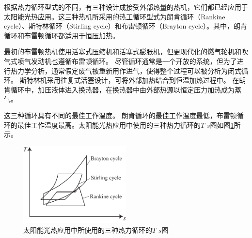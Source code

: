 根据热力循环型式的不同，有三种设计成接受外部热量的热机，它们都已经应用于太阳能光热应用。这三种热机所采用的热工循环型式为朗肯循环（Rankine cycle）、斯特林循环（Stirling cycle）和布雷顿循环（Brayton cycle）。其中，朗肯循环和布雷顿循环都适用于恒压加热。

最初的布雷顿热机使用活塞式压缩机和活塞式膨胀机，但更现代化的燃气轮机和吹气式喷气发动机也遵循布雷顿循环。 尽管循环通常是一个开放的系统，但为了进行热力学分析，通常假定废气被重新用作进气，使得整个过程可以被分析为闭式循环。
斯特林机采用往复式活塞设计，可将外部加热结合到恒温加热过程中。
在朗肯循环中，加压液体进入换热器，在换热器中由外部热源以恒定压力加热成为蒸气。

这三种循环具有不同的最佳工作温度。 朗肯循环的最佳工作温度最低，布雷顿循环的最佳工作温度最高。太阳能光热应用中使用的三种热力循环的$T$-$s$图如图\ref{fig:cycles}所示。

\begin{figure}[h]
\centering 
\includegraphics[width=0.5\textwidth]{fig/cycles}
\caption{太阳能光热应用中所使用的三种热力循环的$T$-$s$图}\label{fig:cycles}
\end{figure}

